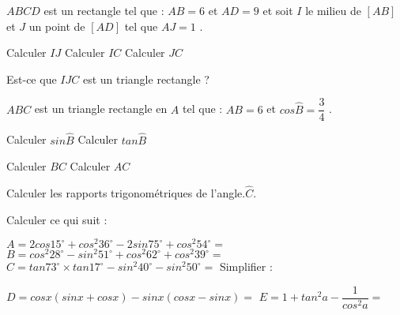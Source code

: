 \documentclass[a4paper,addpoints,12pt]{exam}
\begin{document}
\devoir[ds=true,num=3 ,niv=3 , date=12/01/2023 ,prv=true]


\begin{exo}[8]
$ABCD$ est un rectangle tel que : $AB=6 $ et  $AD=9 $ et soit  $I$ le milieu de $[AB]$ et $J$ un point de  $[AD]$ tel que $AJ=1 $ .
\begin{questions}
\begin{multicols}{3}
\question[2] Calculer  $IJ$
\columnbreak
\question[2] Calculer $IC$
\columnbreak
\question[2] Calculer  $JC$ 
\end{multicols}
\question[2] Est-ce que  $IJC$ est un triangle rectangle ?
\end{questions}
\end{exo}

\begin{exo}[7]
$ABC$ est un triangle rectangle en $A$ tel que : $AB=6$ et $cos\widehat{B}=\dfrac{3}{4}$ .
\begin{questions}
\begin{multicols}{2}
\question[1] Calculer $sin\widehat{B}$
\columnbreak
\question[1] Calculer  $tan\widehat{B}$ 
\end{multicols}%
\begin{multicols}{2}
\question[1] Calculer  $BC$ 
\columnbreak
\question[1] Calculer $AC$ 
\end{multicols}%
\question[3] Calculer les rapports trigonométriques de l'angle.$\widehat{C}$.
\end{questions}
\end{exo}

\begin{exo}[5]
\begin{questions}
\question[3] Calculer ce qui suit :

$A=2cos15^{\circ}+cos^{2}36^{\circ}-2sin75^{\circ}+cos^{2}54^{\circ}=$\anserline[2]
$B=cos^{2}28^{\circ}-sin^{2}51^{\circ}+cos^{2}62^{\circ}+cos^{2}39^{\circ}= $\anserline[2]
$C=tan73^{\circ}\times tan17^{\circ}-sin^{2}40^{\circ}-sin^{2}50^{\circ} =$\anserline[2]\vspace{-10pt}
\question[2] Simplifier :

$D=cosx(sinx+cosx)-sinx(cosx-sinx)  =$ \anserline[3]
$E= 1+tan^{2}a-\dfrac{1}{cos^{2}a}=$\anserline[3]
\end{questions}
\end{exo}
\end{document}
